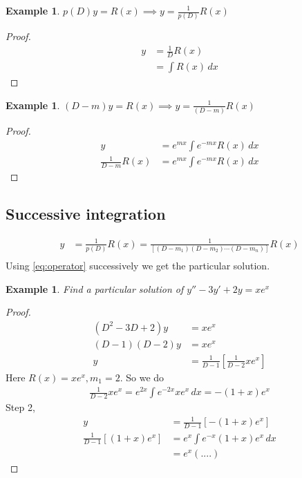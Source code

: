 \documentclass[oneside,11pt,pdftex,final]{book}%
\numberwithin{equation}{section}
\newtheorem{example}[theorem]{Example}
\numberwithin{section}{chapter}
\numberwithin{equation}{chapter}
\begin{document}
\begin{example}
	$ p(D)y=R(x) \implies y= \frac{1}{p(D)}R(x) $
\end{example}
\begin{proof}
	\begin{align*}
		y&=\frac{1}{D}R(x)\\
		&=\int R(x)\, dx
	\end{align*}
\end{proof}
\begin{example}
	$ (D-m)y=R(x) \implies y = \frac{1}{(D-m)}R(x)$
\end{example}
\begin{proof}
	\begin{align}
		y&=e^{mx} \int e^{-mx} R(x)\, dx\\
		\frac{1}{D-m}R(x)&=e^{mx}\int e^{-mx} R(x)\, dx \label{eq:operator}
	\end{align}
\end{proof}

\subsection{Successive integration}
\begin{align*}
	y&=\frac{1}{p(D)} R(x)=\frac{1}{[(D-m_1)(D-m_2)\cdots (D-m_n)]} R(x)\\
\end{align*}
Using \ref{eq:operator} successively we get the particular solution.

\begin{example}
	Find a particular solution of $ y''-3y'+2y=x e^{x} $
\end{example}
\begin{proof}
	\begin{align*}
		(D^2-3D+2) y&=xe^{x}\\
		(D-1)(D-2)y&=xe^{x}\\
		y&=\frac{1}{D-1}\left[\frac{1}{D-2} xe^{x}\right]
	\end{align*}
Here $ R(x) = xe^{x},  m_1=2 $. So we do
\begin{align*}
	\frac{1}{D-2}x e^{x}=e^{2x}\int e^{-2x} x e^{x}\, dx= -(1+x)e^{x}
\end{align*}
Step 2,
\begin{align*}
	y&= \frac{1}{D-1}[-(1+x)e^x]\\
	\frac{1}{D-1}[(1+x)e^x]&= e^x \int e^{-x} (1+x) e^x\, dx\\
	&=e^x\left( .... \right)
\end{align*}
\end{proof}
\end{document}
